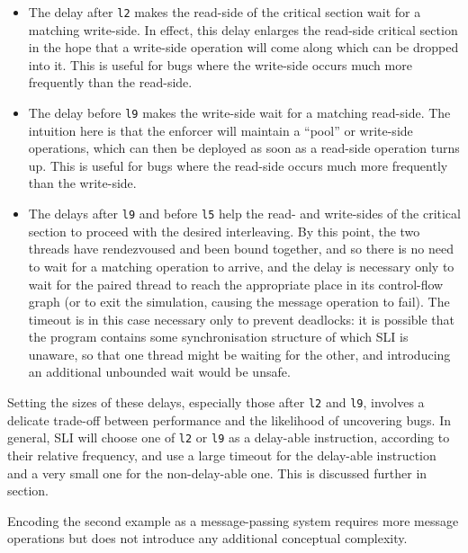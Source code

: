 \begin{itemize}
\item
  The delay after \verb|l2| makes the read-side of the critical
  section wait for a matching write-side.  In effect, this delay
  enlarges the read-side critical section in the hope that a
  write-side operation will come along which can be dropped into it.
  This is useful for bugs where the write-side occurs much more
  frequently than the read-side.
\item
  The delay before \verb|l9| makes the write-side wait for a matching
  read-side.  The intuition here is that the enforcer will maintain a
  ``pool'' or write-side operations, which can then be deployed as
  soon as a read-side operation turns up.  This is useful for bugs
  where the read-side occurs much more frequently than the write-side.
\item
  The delays after \verb|l9| and before \verb|l5| help the read- and
  write-sides of the critical section to proceed with the desired
  interleaving.  By this point, the two threads have rendezvoused and
  been bound together, and so there is no need to wait for a matching
  operation to arrive, and the delay is necessary only to wait for the
  paired thread to reach the appropriate place in its control-flow
  graph (or to exit the simulation, causing the message operation to
  fail).  The timeout is in this case necessary only to prevent
  deadlocks: it is possible that the program contains some
  synchronisation structure of which SLI is unaware, so that one
  thread might be waiting for the other, and introducing an additional
  unbounded wait would be unsafe.

\end{itemize}

Setting the sizes of these delays, especially those after \verb|l2|
and \verb|l9|, involves a delicate trade-off between performance and
the likelihood of uncovering bugs.  In general, SLI will choose one of
\verb|l2| or \verb|l9| as a delay-able instruction, according to their
relative frequency, and use a large timeout for the delay-able
instruction and a very small one for the non-delay-able one.  This is
discussed further in section\needCite{}.

Encoding the second example as a message-passing system requires more
message operations but does not introduce any additional conceptual
complexity.

